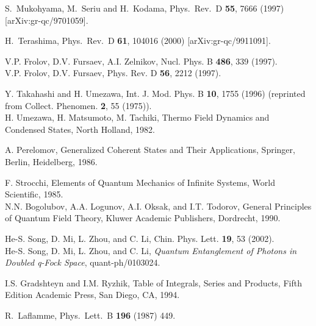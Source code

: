 \begin{thebibliography}{99}
S.~Mukohyama, M.~Seriu and H.~Kodama,
Phys.\ Rev.\ D {\bf 55}, 7666 (1997) [arXiv:gr-qc/9701059].

H.~Terashima,
Phys.\ Rev.\ D {\bf 61}, 104016 (2000) [arXiv:gr-qc/9911091].

 V.P. Frolov, D.V. Fursaev, A.I. Zelnikov, Nucl.
            Phys. B {\bf 486}, 339 (1997). \\
            V.P. Frolov, D.V. Fursaev, Phys. Rev. D {\bf 56}, 2212
            (1997).

 Y. Takahashi and H. Umezawa, Int. J. Mod. Phys.
                B {\bf 10}, 1755 (1996) (reprinted from Collect. Phenomen.
                {\bf 2}, 55 (1975)). \\
                H. Umezawa, H. Matsumoto, M. Tachiki, Thermo
                Field Dynamics and Condensed States, North Holland,
                1982.

 A. Perelomov, Generalized Coherent States and Their
               Applications, Springer, Berlin, Heidelberg, 1986.

 F. Strocchi, Elements of Quantum Mechanics of Infinite
                Systems, World Scientific, 1985. \\
                N.N. Bogolubov, A.A. Logunov, A.I. Oksak, and
                I.T. Todorov, General Principles of Quantum
                Field Theory, Kluwer Academic Publishers, Dordrecht,
                1990.

 He-S. Song, D. Mi, L. Zhou, and C. Li, Chin. Phys.
                Lett. {\bf 19}, 53 (2002). \\
                He-S. Song, D. Mi, L. Zhou, and C. Li, {\it Quantum Entanglement of
                Photons in Doubled q-Fock Space}, quant-ph/0103024.

 I.S. Gradshteyn and I.M. Ryzhik, Table of
                 Integrals, Series and Products, Fifth Edition
                 Academic Press, San Diego, CA, 1994.


R.~Laflamme,
Phys.\ Lett.\ B {\bf 196} (1987) 449.

 \end{thebibliography}
 

